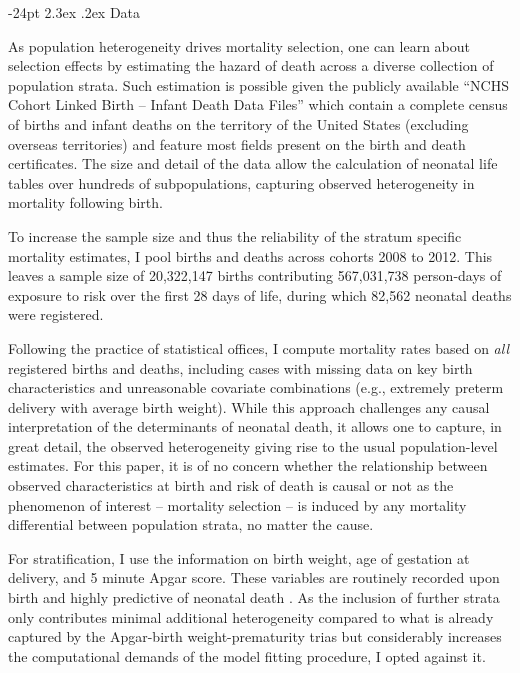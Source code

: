 \documentclass[10pt,twoside,reqno]{article}
\makeatletter
\renewcommand\section{\@startsection {section}{1}{\z@}%
                                   {-24pt}%
                                   {2.3ex \@plus.2ex}%
                                   {\normalfont\large\bfseries}}
\makeatother
\begin{document}
\section{Data}\label{data}

As population heterogeneity drives mortality selection, one can learn about selection effects by estimating the hazard of death across a diverse collection of population strata. Such estimation is possible given the publicly available ``NCHS Cohort Linked Birth -- Infant Death Data Files'' \citep{NCHS2016} which contain a complete census of births and infant deaths on the territory of the United States (excluding overseas territories) and feature most fields present on the birth and death certificates. The size and detail of the data allow the calculation of neonatal life tables over hundreds of subpopulations, capturing observed heterogeneity in mortality following birth.

To increase the sample size and thus the reliability of the stratum specific mortality estimates, I pool births and deaths across cohorts 2008 to 2012. This leaves a sample size of 20,322,147 births contributing 567,031,738 person-days of exposure to risk over the first 28 days of life, during which 82,562 neonatal deaths were registered.

Following the practice of statistical offices, I compute mortality rates based on \emph{all} registered births and deaths, including cases with missing data on key birth characteristics and unreasonable covariate combinations (e.g., extremely preterm delivery with average birth weight). While this approach challenges any causal interpretation of the determinants of neonatal death, it allows one to capture, in great detail, the observed heterogeneity giving rise to the usual population-level estimates. For this paper, it is of no concern whether the relationship between observed characteristics at birth and risk of death is causal or not as the phenomenon of interest -- mortality selection -- is induced by any mortality differential between population strata, no matter the cause.

For stratification, I use the information on birth weight, age of gestation at delivery, and 5 minute Apgar score. These variables are routinely recorded upon birth and highly predictive of neonatal death \citep{Pollack2000, Casey2001, Park2018}. As the inclusion of further strata only contributes minimal additional heterogeneity compared to what is already captured by the Apgar-birth weight-prematurity trias but considerably increases the computational demands of the model fitting procedure, I opted against it.
\end{document}
